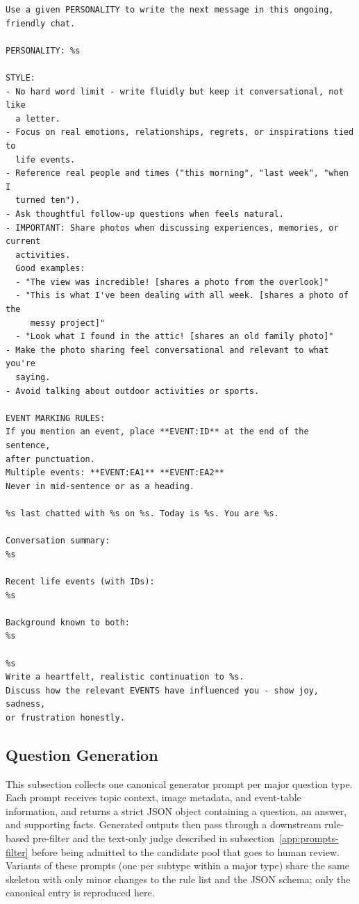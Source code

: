 \documentclass{llmxive}
\begin{document}
\begin{promptbox}[colback=black!5, colframe=white!40!black, title=Haystack: Persona-Driven Dialogue Turn]{}
\scriptsize
\begin{verbatim}
Use a given PERSONALITY to write the next message in this ongoing,
friendly chat.

PERSONALITY: %s

STYLE:
- No hard word limit - write fluidly but keep it conversational, not like
  a letter.
- Focus on real emotions, relationships, regrets, or inspirations tied to
  life events.
- Reference real people and times ("this morning", "last week", "when I
  turned ten").
- Ask thoughtful follow-up questions when feels natural.
- IMPORTANT: Share photos when discussing experiences, memories, or current
  activities.
  Good examples:
  - "The view was incredible! [shares a photo from the overlook]"
  - "This is what I've been dealing with all week. [shares a photo of the
     messy project]"
  - "Look what I found in the attic! [shares an old family photo]"
- Make the photo sharing feel conversational and relevant to what you're
  saying.
- Avoid talking about outdoor activities or sports.

EVENT MARKING RULES:
If you mention an event, place **EVENT:ID** at the end of the sentence,
after punctuation.
Multiple events: **EVENT:EA1** **EVENT:EA2**
Never in mid-sentence or as a heading.

%s last chatted with %s on %s. Today is %s. You are %s.

Conversation summary:
%s

Recent life events (with IDs):
%s

Background known to both:
%s

%s
Write a heartfelt, realistic continuation to %s.
Discuss how the relevant EVENTS have influenced you - show joy, sadness,
or frustration honestly.
\end{verbatim}
\end{promptbox}

\subsection{Question Generation}
\label{app:prompts-qg}

This subsection collects one canonical generator prompt per major question type. Each prompt receives topic context, image metadata, and event-table information, and returns a strict JSON object containing a question, an answer, and supporting facts. Generated outputs then pass through a downstream rule-based pre-filter and the text-only judge described in subsection~\ref{app:prompts-filter} before being admitted to the candidate pool that goes to human review. Variants of these prompts (one per subtype within a major type) share the same skeleton with only minor changes to the rule list and the JSON schema; only the canonical entry is reproduced here.
\end{document}
